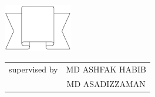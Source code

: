 \documentclass[a4paper,11pt]{report}
\begin{document}
\begin{titlepage}
{\begin{tabular}{cl}
	\end{tabular}
}
\parbox[r]{8cm}{
	\begin{center}
		\includegraphics[width=3cm, keepaspectratio]{remarks.png}
	\end{center}
}

\vspace{1cm}
\begin{tabular}{cc}
	supervised by & MD ASHFAK HABIB \\
	              & MD ASADIZZAMAN
\end{tabular}

\vfill
\end{titlepage}
\end{document}
